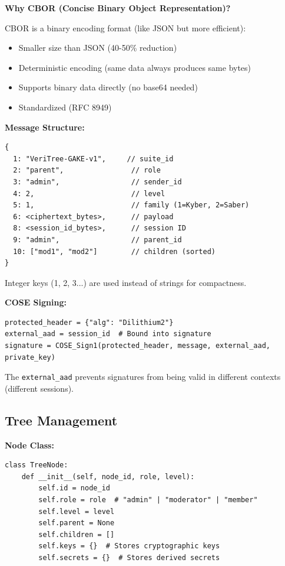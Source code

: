 \documentclass[12pt,a4paper]{report}
\begin{document}
\textbf{Why CBOR (Concise Binary Object Representation)?}

CBOR is a binary encoding format (like JSON but more efficient):
\begin{itemize}
\item Smaller size than JSON (40-50\% reduction)
\item Deterministic encoding (same data always produces same bytes)
\item Supports binary data directly (no base64 needed)
\item Standardized (RFC 8949)
\end{itemize}

\textbf{Message Structure:}

\begin{verbatim}
{
  1: "VeriTree-GAKE-v1",     // suite_id
  2: "parent",                // role
  3: "admin",                 // sender_id
  4: 2,                       // level
  5: 1,                       // family (1=Kyber, 2=Saber)
  6: <ciphertext_bytes>,      // payload
  8: <session_id_bytes>,      // session ID
  9: "admin",                 // parent_id
  10: ["mod1", "mod2"]        // children (sorted)
}
\end{verbatim}

Integer keys (1, 2, 3...) are used instead of strings for compactness.

\textbf{COSE Signing:}

\begin{verbatim}
protected_header = {"alg": "Dilithium2"}
external_aad = session_id  # Bound into signature
signature = COSE_Sign1(protected_header, message, external_aad, private_key)
\end{verbatim}

The \texttt{external\_aad} prevents signatures from being valid in different contexts (different sessions).

\subsection{Tree Management}

\textbf{Node Class:}

\begin{verbatim}
class TreeNode:
    def __init__(self, node_id, role, level):
        self.id = node_id
        self.role = role  # "admin" | "moderator" | "member"
        self.level = level
        self.parent = None
        self.children = []
        self.keys = {}  # Stores cryptographic keys
        self.secrets = {}  # Stores derived secrets
\end{verbatim}
\end{document}
